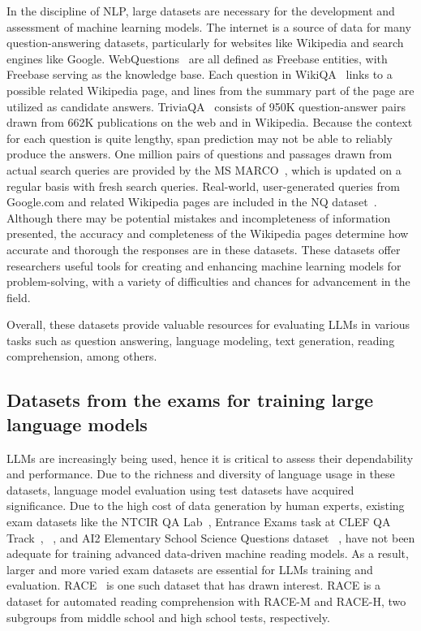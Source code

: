 \documentclass{article}
\begin{document}
{	In the discipline of NLP, large datasets are necessary for the development and assessment of machine learning models. The internet is a source of data for many question-answering datasets, particularly for websites like Wikipedia and search engines like Google. WebQuestions~\cite{berant2013semantic} are all defined as Freebase entities, with Freebase serving as the knowledge base. Each question in WikiQA~\cite{yang2015wikiqa} links to a possible related Wikipedia page, and lines from the summary part of the page are utilized as candidate answers. TriviaQA~\cite{joshi2017triviaqa} consists of 950K question-answer pairs drawn from 662K publications on the web and in Wikipedia. Because the context for each question is quite lengthy, span prediction may not be able to reliably produce the answers. One million pairs of questions and passages drawn from actual search queries are provided by the MS MARCO~\cite{nguyen2016ms}, which is updated on a regular basis with fresh search queries. Real-world, user-generated queries from Google.com and related Wikipedia pages are included in the NQ dataset~\cite{kwiatkowski2019natural}. Although there may be potential mistakes and incompleteness of information presented, the accuracy and completeness of the Wikipedia pages determine how accurate and thorough the responses are in these datasets. These datasets offer researchers useful tools for creating and enhancing machine learning models for problem-solving, with a variety of difficulties and chances for advancement in the field.
	
	Overall, these datasets provide valuable resources for evaluating LLMs in various tasks such as question answering, language modeling, text generation, reading comprehension, among others.
	
	\subsection{Datasets from the exams for training large language models}
	
	LLMs are increasingly being used, hence it is critical to assess their dependability and performance. Due to the richness and diversity of language usage in these datasets, language model evaluation using test datasets have acquired significance. Due to the high cost of data generation by human experts, existing exam datasets like the NTCIR QA Lab~\cite{shibuki2014overview}, Entrance Exams task at CLEF QA Track~\cite{penas2014overview}, ~\cite{rodrigo2015overview}, and AI2 Elementary School Science Questions dataset ~\cite{khashabi2016question}, have not been adequate for training advanced data-driven machine reading models. As a result, larger and more varied exam datasets are essential for LLMs training and evaluation. RACE~\cite{Lai2017} is one such dataset that has drawn interest. RACE is a dataset for automated reading comprehension with RACE-M and RACE-H, two subgroups from middle school and high school tests, respectively.
	
}
\end{document}

